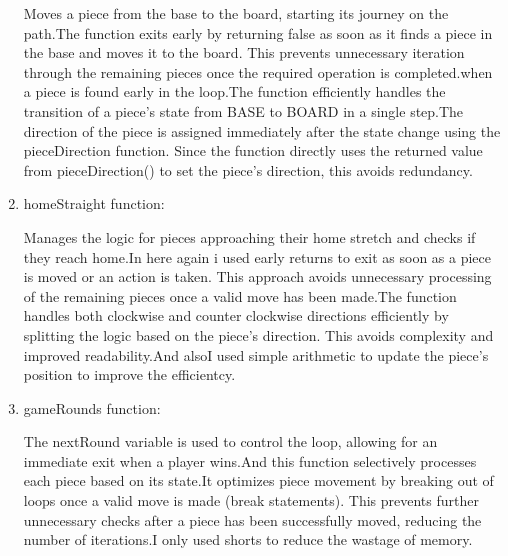 \documentclass[a4paper,12pt]{article}
\begin{document}
\begin{enumerate}
Moves a piece from the base to the board, starting its journey on the path.The function exits early by returning false as soon as it finds a piece in the base and moves it to the board. This prevents unnecessary iteration through the remaining pieces once the required operation is completed.when a piece is found early in the loop.The function efficiently handles the transition of a piece’s state from BASE to BOARD in a single step.The direction of the piece is assigned immediately after the state change using the pieceDirection function. Since the function directly uses the returned value from pieceDirection() to set the piece's direction, this avoids redundancy. 


\item homeStraight function:

Manages the logic for pieces approaching their home stretch and checks if they reach home.In here again i used early returns to exit as soon as a piece is moved or an action is taken. This approach avoids unnecessary processing of the remaining pieces once a valid move has been made.The function handles both clockwise and counter clockwise directions efficiently by splitting the logic based on the piece's direction. This avoids complexity and improved readability.And alsoI used simple arithmetic to update the piece's position to improve the efficientcy.
\item gameRounds function:

The nextRound variable is used to control the loop, allowing for an immediate exit when a player wins.And this function selectively processes each piece based on its state.It optimizes piece movement by breaking out of loops once a valid move is made (break statements). This prevents further unnecessary checks after a piece has been successfully moved, reducing the number of iterations.I only used shorts to reduce the wastage of memory.

\end{enumerate}
\end{document}
